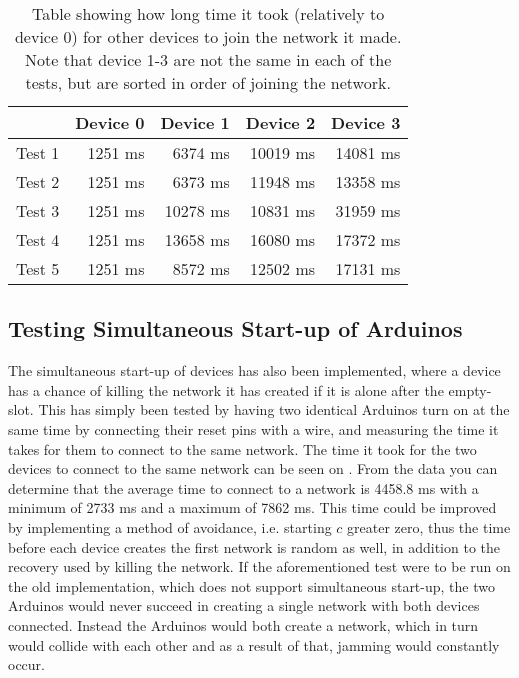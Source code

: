 \begin{table}[H]
\footnotesize
\centering  
{}
\begin{tabular}{r | r r r r}
        & Device 0  & Device 1  & Device 2  & Device 3  \\\midrule
 Test 1 &   1251 ms &   6374 ms &   10019 ms&   14081 ms\\
 Test 2 &   1251 ms &   6373 ms &   11948 ms&   13358 ms\\
 Test 3 &   1251 ms &   10278 ms&   10831 ms&   31959 ms\\
 Test 4 &   1251 ms &   13658 ms&   16080 ms&   17372 ms\\
 Test 5 &   1251 ms &   8572 ms &   12502 ms&   17131 ms\\   
\end{tabular}
\caption{Table showing how long time it took (relatively to device 0) for other devices to join the network it made. Note that device 1-3 are not the same in each of the tests, but are sorted in order of joining the network.}
\label{tab:ccrc_test}
\end{table}

\subsection{Testing Simultaneous Start-up of Arduinos}
The simultaneous start-up of devices has also been implemented, where a device has a chance of killing the network it has created if it is alone after the empty-slot.
This has simply been tested by having two identical Arduinos turn on at the same time by connecting their reset pins with a wire, and measuring the time it takes for them to connect to the same network.
The time it took for the two devices to connect to the same network can be seen on .
From the data you can determine that the average time to connect to a network is 4458.8 ms with a minimum of 2733 ms and a maximum of 7862 ms.
This time could be improved by implementing a method of avoidance, i.e. starting $c$ greater zero, thus the time before each device creates the first network is random as well, in addition to the recovery used by killing the network.
If the aforementioned test were to be run on the old implementation, which does not support simultaneous start-up, the two Arduinos would never succeed in creating a single network with both devices connected.
Instead the Arduinos would both create a network, which in turn would collide with each other and as a result of that, jamming would constantly occur.

